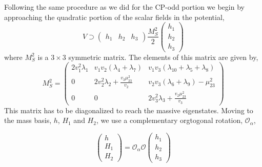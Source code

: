 Following the same procedure as we did for the CP-odd portion we begin by approaching the quadratic portion of the scalar fields in the potential,
%
\begin{equation}
V \supset \left( \begin{array}{ccc} 
h_1 & h_2 & h_3 
\end{array} \right) 
\frac{M_S^2}{2} \left( \begin{array}{c}
h_1 \\ 
h_2 \\
h_3
\end{array} \right) 
\end{equation}
where $M_S^2$ is a $3\times3$ symmetric matrix. The elements of this matrix are given by,
\begin{equation}
M_S^2 = \begin{pmatrix}
2 v_1^2 \lambda_1 & v_1 v_2 \left( \lambda_4 + \lambda_7 \right) & v_1 v_3 \left( \lambda_{10} + \lambda_5 + \lambda_8 \right) \\ 
0 & 2 v_2^2 \lambda_2 + \frac{v_3 \mu_{23}^2}{v_2} & v_2 v_3 \left( \lambda_6 + \lambda_9 \right) - \mu_{23}^2 \\ 
0 & 0 & 2 v_3^2 \lambda_3 + \frac{v_2 \mu_{23}^2}{v_3}  
\end{pmatrix}
\end{equation}
%
This matrix has to be diagonalized to reach the massive eigenstates. Moving to the mass basis, $h$, $H_1$ and $H_2$, we use a complementary orgtogonal rotation, $\mathcal{O}_\alpha$,

\begin{equation}
\left( 
\begin{array}{c}
h   \\
H_1 \\
H_2 
\end{array} 
\right) = \mathcal{O}_\alpha \mathcal{O} \left( 
\begin{array}{c}
h_1 \\
h_2 \\
h_3 
\end{array} 
\right)
\end{equation} 
